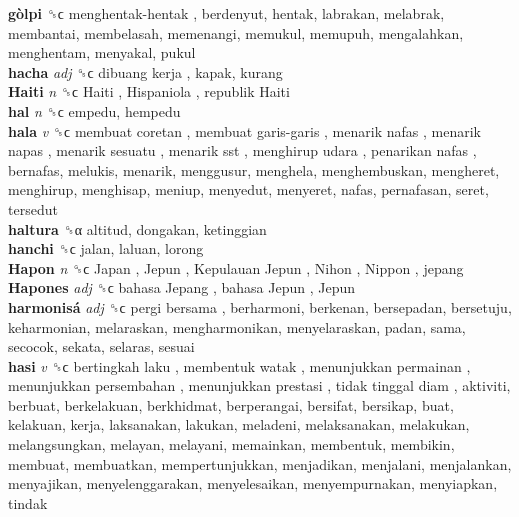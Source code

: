 \textbf{gòlpi} ␝ϲ   menghentak-hentak , berdenyut, hentak, labrakan, melabrak, membantai, membelasah, memenangi, memukul, memupuh, mengalahkan, menghentam, menyakal, pukul  \\
\textbf{hacha} \emph{adj}  ␝ϲ   dibuang kerja , kapak, kurang  \\
\textbf{Haiti} \emph{n}  ␝ϲ   Haiti ,  Hispaniola ,  republik Haiti   \\
\textbf{hal} \emph{n}  ␝ϲ  empedu, hempedu  \\
\textbf{hala} \emph{v}  ␝ϲ   membuat coretan ,  membuat garis-garis ,  menarik nafas ,  menarik napas ,  menarik sesuatu ,  menarik sst ,  menghirup udara ,  penarikan nafas , bernafas, melukis, menarik, menggusur, menghela, menghembuskan, mengheret, menghirup, menghisap, meniup, menyedut, menyeret, nafas, pernafasan, seret, tersedut  \\
\textbf{haltura} ␝α  altitud, dongakan, ketinggian  \\
\textbf{hanchi} ␝ϲ  jalan, laluan, lorong  \\
\textbf{Hapon} \emph{n}  ␝ϲ   Japan ,  Jepun ,  Kepulauan Jepun ,  Nihon ,  Nippon , jepang  \\
\textbf{Hapones} \emph{adj}  ␝ϲ   bahasa Jepang ,  bahasa Jepun ,  Jepun   \\
\textbf{harmonisá} \emph{adj}  ␝ϲ   pergi bersama , berharmoni, berkenan, bersepadan, bersetuju, keharmonian, melaraskan, mengharmonikan, menyelaraskan, padan, sama, secocok, sekata, selaras, sesuai  \\
\textbf{hasi} \emph{v}  ␝ϲ   bertingkah laku ,  membentuk watak ,  menunjukkan permainan ,  menunjukkan persembahan ,  menunjukkan prestasi ,  tidak tinggal diam , aktiviti, berbuat, berkelakuan, berkhidmat, berperangai, bersifat, bersikap, buat, kelakuan, kerja, laksanakan, lakukan, meladeni, melaksanakan, melakukan, melangsungkan, melayan, melayani, memainkan, membentuk, membikin, membuat, membuatkan, mempertunjukkan, menjadikan, menjalani, menjalankan, menyajikan, menyelenggarakan, menyelesaikan, menyempurnakan, menyiapkan, tindak  \\
